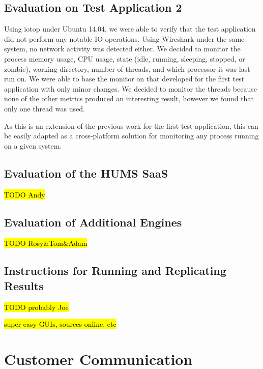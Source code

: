 \documentclass[10pt,a4paper]{article}
\begin{document}
\subsection{Evaluation on Test Application 2}
\label{sec:test_app2}

Using iotop under Ubuntu 14.04, we were able to verify that the test application did not perform any notable IO operations. Using Wireshark under the same system, no network activity was detected either.
We decided to monitor the process memory usage, CPU usage, state (idle, running, sleeping, stopped, or zombie), working directory, number of threads, and which processor it was last run on. We were able to base the monitor on that developed for the first test application with only minor changes. We decided to monitor the threads because none of the other metrics produced an interesting result, however we found that only one thread was used.

As this is an extension of the previous work for the first test application, this can be easily adapted as a cross-platform solution for monitoring any process running on a given system. 

\subsection{Evaluation of the HUMS SaaS}
\label{sec:hums_saas}
\hl{TODO Andy}


\subsection{Evaluation of Additional Engines}
\label{sec:additional}
\hl{TODO Rosy\&Tom\&Adam}


\subsection{Instructions for Running and Replicating Results}
\label{sec:instructions}

\hl{TODO probably Joe}

\hl{super easy GUIs, sources online, etc}


\section{Customer Communication}
\label{sec:customer_comms}
\end{document}
